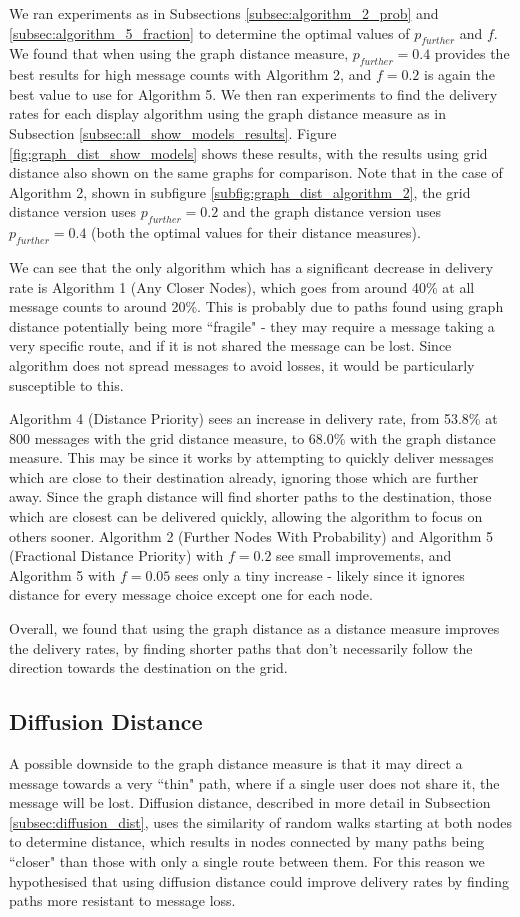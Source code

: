 \documentclass[bsc,frontabs,twoside,singlespacing,parskip,deptreport]{infthesis}     %
\begin{document}
We ran experiments as in Subsections \ref{subsec:algorithm_2_prob} and \ref{subsec:algorithm_5_fraction} to determine the optimal values of $p_{further}$ and $f$. We found that when using the graph distance measure, $p_{further}=0.4$ provides the best results for high message counts with Algorithm 2, and $f=0.2$ is again the best value to use for Algorithm 5. We then ran experiments to find the delivery rates for each display algorithm using the graph distance measure as in Subsection \ref{subsec:all_show_models_results}. Figure \ref{fig:graph_dist_show_models} shows these results, with the results using grid distance also shown on the same graphs for comparison. Note that in the case of Algorithm 2, shown in subfigure \ref{subfig:graph_dist_algorithm_2}, the grid distance version uses $p_{further}=0.2$ and the graph distance version uses $p_{further}=0.4$ (both the optimal values for their distance measures).

We can see that the only algorithm which has a significant decrease in delivery rate is Algorithm 1 (Any Closer Nodes), which goes from around 40\% at all message counts to around 20\%. This is probably due to paths found using graph distance potentially being more ``fragile" - they may require a message taking a very specific route, and if it is not shared the message can be lost. Since algorithm does not spread messages to avoid losses, it would be particularly susceptible to this.

Algorithm 4 (Distance Priority) sees an increase in delivery rate, from 53.8\% at 800 messages with the grid distance measure, to 68.0\% with the graph distance measure. This may be since it works by attempting to quickly deliver messages which are close to their destination already, ignoring those which are further away. Since the graph distance will find shorter paths to the destination, those which are closest can be delivered quickly, allowing the algorithm to focus on others sooner. Algorithm 2 (Further Nodes With Probability) and Algorithm 5 (Fractional Distance Priority) with $f=0.2$ see small improvements, and Algorithm 5 with $f=0.05$ sees only a tiny increase - likely since it ignores distance for every message choice except one for each node.

Overall, we found that using the graph distance as a distance measure improves the delivery rates, by finding shorter paths that don't necessarily follow the direction towards the destination on the grid.

\subsection{Diffusion Distance}
A possible downside to the graph distance measure is that it may direct a message towards a very ``thin" path, where if a single user does not share it, the message will be lost. Diffusion distance, described in more detail in Subsection \ref{subsec:diffusion_dist}, uses the similarity of random walks starting at both nodes to determine distance, which results in nodes connected by many paths being ``closer" than those with only a single route between them. For this reason we hypothesised that using diffusion distance could improve delivery rates by finding paths more resistant to message loss.
\end{document}

